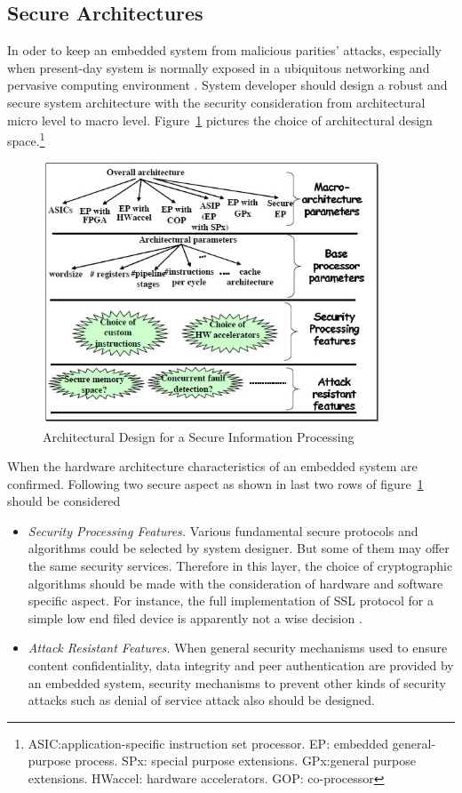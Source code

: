 \subsection{Secure Architectures}
In oder to keep an embedded system from malicious parities' attacks, especially when present-day system is normally exposed in a ubiquitous networking and pervasive computing environment \cite{embedded_secure}. System developer should design a robust and secure system architecture with the security consideration from architectural micro level to macro level. Figure~\ref{fig:design-space} pictures the choice of architectural design space.\footnote{ASIC:application-specific instruction set processor. EP: embedded general-purpose process. SPx: special purpose extensions. GPx:general purpose extensions. HWaccel: hardware accelerators. GOP: co-processor}
\begin{figure}[htb]
	\centering
	\includegraphics[width=0.9\textwidth]{design-space.jpg}
		\caption{Architectural Design for a Secure Information Processing \cite{embedded_secure}}
	\label{fig:design-space}
\end{figure}

When the hardware architecture characteristics of an embedded system are confirmed. Following two secure aspect as shown in last two rows of figure~\ref{fig:design-space} should be considered
\begin{itemize}
\item \emph{Security Processing Features.} Various fundamental secure protocols and algorithms could be selected by system designer. But some of them may offer the same security services. Therefore in this layer, the choice of cryptographic algorithms should be made with the consideration of hardware and software specific aspect. For instance, the full implementation of SSL protocol for a simple low end filed device is apparently not a wise decision \cite{embedded_secure}.
\item \emph{Attack Resistant Features.} When general security mechanisms used to ensure content confidentiality, data integrity and peer authentication are provided by an embedded system, security mechanisms to prevent other kinds of security attacks such as denial of service attack also should be designed.
\end{itemize}

